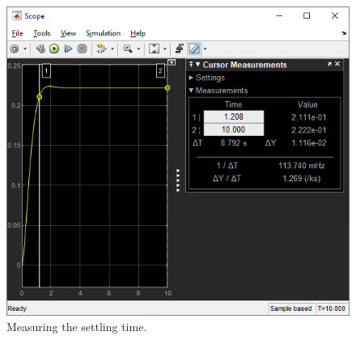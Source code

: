 \documentclass[12pt]{article}
\begin{document}
\begin{figure}[h]
    \centering
    \includegraphics[width=\linewidth]{part01a_measuring_settling_time.png}
    \caption{Measuring the settling time.}
    \label{fig:step - measuring setting time}
\end{figure}
\end{document}
